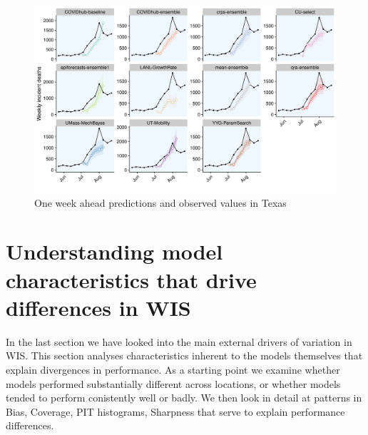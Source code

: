 \documentclass[
]{book}
\begin{document}
\begin{figure}
\includegraphics[width=1\linewidth]{../visualisation/chapter-5-results/scenario-baseline/Texas-one-week} \caption{One week ahead predictions and observed values in Texas}\label{fig:pred-texas}
\end{figure}

\hypertarget{model-characteristics}{%
\section{Understanding model characteristics that drive differences in WIS}\label{model-characteristics}}

In the last section we have looked into the main external drivers of variation in WIS. This section analyses characteristics inherent to the models themselves that explain divergences in performance. As a starting point we examine whether models performed substantially different across locations, or whether models tended to perform conistently well or badly. We then look in detail at patterns in Bias, Coverage, PIT histograms, Sharpness that serve to explain performance differences.
\end{document}
